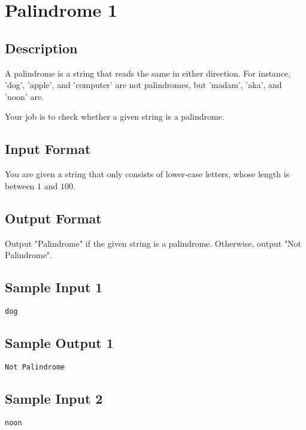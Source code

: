 

\begin{center}\end{center}
\vspace{5mm}


\section{Palindrome 1}

\subsection*{Description}
A palindrome is a string that reads the same in either direction.
For instance, 'dog', 'apple', and 'computer' are not palindromes, but 'madam', 'aka', and 'noon' are.

Your job is to check whether a given string is a palindrome.

\subsection*{Input Format}
You are given a string that only consists of lower-case letters, whose length is between $1$ and $100$. 

\subsection*{Output Format}
Output "Palindrome" if the given string is a palindrome.
Otherwise, output "Not Palindrome".


\subsection*{Sample Input 1}
\begin{verbatim}
dog
\end{verbatim}

\subsection*{Sample Output 1}
\begin{verbatim}
Not Palindrome
\end{verbatim}

\subsection*{Sample Input 2}
\begin{verbatim}
noon
\end{verbatim}

